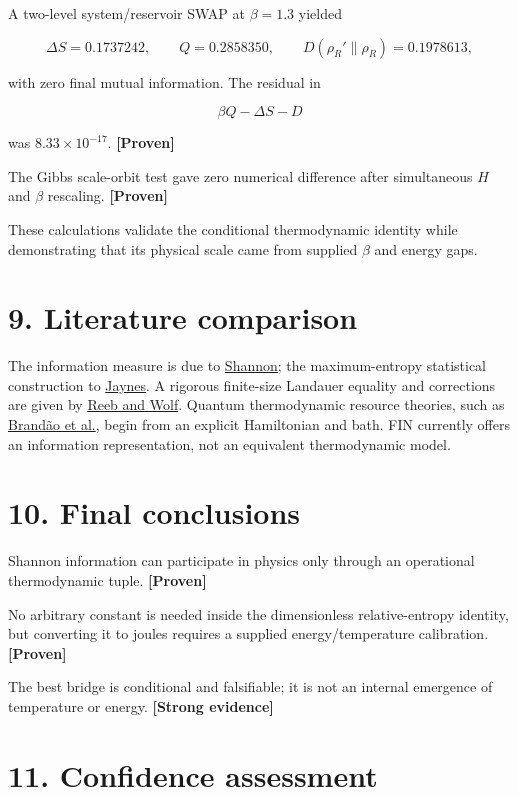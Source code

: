 \documentclass[11pt,a4paper,openany]{report}
\newcommand{\statusProven}{\textcolor{fingreen}{[Proven]}}
\newcommand{\statusStrong}{\textcolor{finblue}{[Strong evidence]}}
\begin{document}
A two-level system/\allowbreak{}reservoir SWAP at \(\beta=1.3\) yielded

\[
\Delta S=0.1737242,\qquad
Q=0.2858350,\qquad
D(\rho_R'\|\rho_R)=0.1978613,
\]

with zero final mutual information. The residual in

\[
\beta Q-\Delta S-D
\]

was \(8.33\times10^{-17}\). \textbf{\statusProven{}}

The Gibbs scale-orbit test gave zero numerical difference after simultaneous \(H\) and \(\beta\) rescaling. \textbf{\statusProven{}}

These calculations validate the conditional thermodynamic identity while demonstrating that its physical scale came from supplied \(\beta\) and energy gaps.

\section{9. Literature comparison}

The information measure is due to \href{https://doi.org/10.1002/j.1538-7305.1948.tb01338.x}{Shannon}; the maximum-entropy statistical construction to \href{https://doi.org/10.1103/PhysRev.106.620}{Jaynes}. A rigorous finite-size Landauer equality and corrections are given by \href{https://arxiv.org/abs/1306.4352}{Reeb and Wolf}. Quantum thermodynamic resource theories, such as \href{https://arxiv.org/abs/1305.5278}{Brandão et al.}, begin from an explicit Hamiltonian and bath. FIN currently offers an information representation, not an equivalent thermodynamic model.

\section{10. Final conclusions}

Shannon information can participate in physics only through an operational thermodynamic tuple. \textbf{\statusProven{}}

No arbitrary constant is needed inside the dimensionless relative-entropy identity, but converting it to joules requires a supplied energy/\allowbreak{}temperature calibration. \textbf{\statusProven{}}

The best bridge is conditional and falsifiable; it is not an internal emergence of temperature or energy. \textbf{\statusStrong{}}

\section{11. Confidence assessment}
\end{document}
